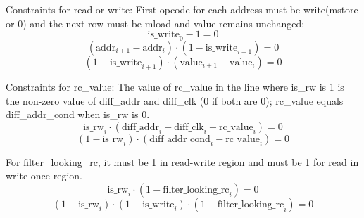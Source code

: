 Constraints for read or write: First opcode for each address must be write(mstore or 0) and the next row must be mload and value remains unchanged:
\[ \mathrm{is\_write}_0-1=0 \]
\[ (\mathrm{addr}_{i+1}-\mathrm{addr}_i) \cdot (1-\mathrm{is\_write}_{i+1})=0 \]
\[ (1-\mathrm{is\_write}_{i+1}) \cdot (\mathrm{value}_{i+1}-\mathrm{value}_i)=0 \]

Constraints for rc\_value:
The value of rc\_value in the line where is\_rw is 1 is the non-zero value of diff\_addr and diff\_clk (0 if both are 0); rc\_value equals diff\_addr\_cond when is\_rw is 0.
\[ \mathrm{is\_rw}_i \cdot (\mathrm{diff\_addr}_i + \mathrm{diff\_clk}_i - \mathrm{rc\_value}_i)=0 \]
\[ (1-\mathrm{is\_rw}_i) \cdot (\mathrm{diff\_addr\_cond}_i - \mathrm{rc\_value}_i)=0 \]

For filter\_looking\_rc, it must be 1 in read-write region and must be 1 for read in write-once region.
\[ \mathrm{is\_rw}_i \cdot (1-\mathrm{filter\_looking\_rc}_i)=0 \]
\[ (1-\mathrm{is\_rw}_i) \cdot (1-\mathrm{is\_write}_i) \cdot (1-\mathrm{filter\_looking\_rc}_i)=0 \]
